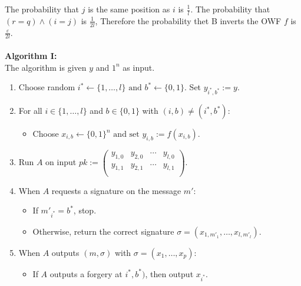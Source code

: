 \documentclass[oneside,a4paper,12pt]{book}
\begin{document}
The probability that $j$ is the same position as $i$ is $\frac{1}{l}$. The probability that \newline $(r=q) \wedge (i=j)$ is $\frac{1}{2l}$, Therefore the probability thet B inverts the OWF $f$ is $\frac{\varepsilon}{2l}$.\\\\
\textbf{Algorithm I:}\\
The algorithm is given $y$ and $1^n$ as input.
\begin{enumerate}
\item Choose random $i^*\gets\{1,\ldots,l\} \text{ and } b^*\gets\{0,1\}$. Set $y_{i^*,b^*} := y.$
\item For all $i\in\{1,\ldots, l\}$ and $b\in\{0,1\}$ with $(i,b)\not=(i^*,b^*):$ 
\begin{itemize}
\item Choose $x_{i,b}\gets\{0,1\}^n \text{ and set } y_{i,b}:=f(x_{i,b}).$
\end{itemize}
\item Run $A$ on input $pk:= \begin{pmatrix}
  y_{1,0} & y_{2,0} & \cdots & y_{l,0} \\
  y_{1,1} & y_{2,1} & \cdots & y_{l,1} \\
\end{pmatrix}$.
\item When $A$ requests a signature on the message $m'$:
\begin{itemize}
\item If $m'_{i^*}=b^*$, stop.
\item Otherwise, return the correct signature $\sigma = (x_{1,m'_1},\ldots,x_{l,m'_l}).$
\end{itemize}
\item When $A$ outputs $(m,\sigma)$ with $\sigma = (x_1,\ldots,x_p):$
\begin{itemize}
\item If $A$ outputs a forgery at $i^*, b^*)$, then output $x_{i^*}$.
\end{itemize}
\end{enumerate}
\end{document}
